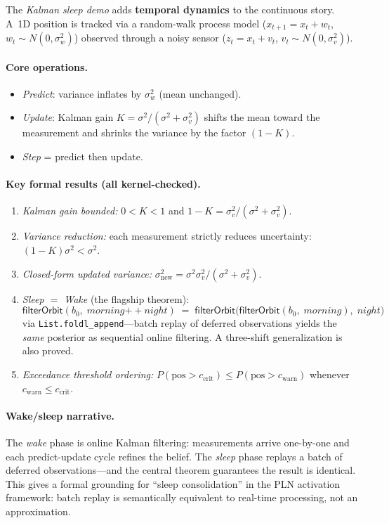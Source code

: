 \documentclass[11pt,openany]{report}
\begin{document}
The \emph{Kalman sleep demo} adds \textbf{temporal dynamics} to the
continuous story.  A~1D position is tracked via a random-walk process
model ($x_{t+1} = x_t + w_t$, $w_t \sim N(0,\sigma_w^2)$) observed
through a noisy sensor ($z_t = x_t + v_t$, $v_t \sim N(0,\sigma_v^2)$).

\paragraph{Core operations.}
\begin{itemize}
\item \emph{Predict}: variance inflates by $\sigma_w^2$ (mean unchanged).
\item \emph{Update}: Kalman gain $K = \sigma^2/(\sigma^2 + \sigma_v^2)$
  shifts the mean toward the measurement and shrinks the variance by
  the factor $(1-K)$.
\item \emph{Step} = predict then update.
\end{itemize}

\paragraph{Key formal results (all kernel-checked).}
\begin{enumerate}
\item \emph{Kalman gain bounded:} $0 < K < 1$ and $1-K = \sigma_v^2/(\sigma^2+\sigma_v^2)$.
\item \emph{Variance reduction:} each measurement strictly reduces
  uncertainty: $(1-K)\sigma^2 < \sigma^2$.
\item \emph{Closed-form updated variance:}
  $\sigma^2_{\mathrm{new}} = \sigma^2 \sigma_v^2 / (\sigma^2 + \sigma_v^2)$.
\item \emph{Sleep $=$ Wake} (the flagship theorem):
  \[
    \mathsf{filterOrbit}(b_0,\; \mathit{morning} \mathbin{+\!+} \mathit{night})
    \;=\;
    \mathsf{filterOrbit}\bigl(\mathsf{filterOrbit}(b_0,\;\mathit{morning}),\;
      \mathit{night}\bigr)
  \]
  via \texttt{List.foldl\_append}---batch replay of deferred
  observations yields the \emph{same} posterior as sequential online
  filtering.  A three-shift generalization is also proved.
\item \emph{Exceedance threshold ordering:}
  $P(\text{pos} > c_{\mathrm{crit}}) \le P(\text{pos} > c_{\mathrm{warn}})$
  whenever $c_{\mathrm{warn}} \le c_{\mathrm{crit}}$.
\end{enumerate}

\paragraph{Wake/sleep narrative.}
The \emph{wake} phase is online Kalman filtering: measurements arrive
one-by-one and each predict-update cycle refines the belief.  The
\emph{sleep} phase replays a batch of deferred observations---and
the central theorem guarantees the result is identical.  This gives a
formal grounding for ``sleep consolidation'' in the PLN activation
framework: batch replay is semantically equivalent to real-time
processing, not an approximation.
\end{document}
